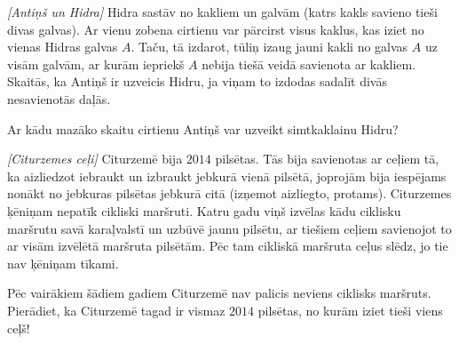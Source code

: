 \begin{problem}
\textit{[Antiņš un Hidra]}
Hidra sastāv no kakliem un galvām (katrs kakls savieno tieši divas galvas). Ar vienu zobena cirtienu var pārcirst visus kaklus, kas iziet no vienas Hidras galvas $A$. Taču, tā izdarot, tūliņ izaug jauni kakli no galvas $A$ uz visām galvām, ar kurām iepriekš $A$ nebija tiešā veidā savienota ar kakliem. 
Skaitās, ka Antiņš ir uzveicis Hidru, ja viņam to izdodas sadalīt divās nesavienotās daļās. 

Ar kādu mazāko skaitu cirtienu Antiņš var uzveikt simtkaklainu Hidru?

\end{problem}
%

\begin{problem}
\textit{[Citurzemes ceļi]}
Citurzemē bija $2014$ pilsētas. Tās bija savienotas ar ceļiem tā, ka aizliedzot iebraukt un izbraukt jebkurā vienā pilsētā, joprojām bija iespējams nonākt no jebkuras pilsētas jebkurā citā (izņemot aizliegto, protams). 
Citurzemes ķēniņam nepatīk cikliski maršruti. Katru gadu viņš izvēlas kādu ciklisku maršrutu savā karaļvalstī un uzbūvē jaunu pilsētu, ar tiešiem ceļiem savienojot to ar visām izvēlētā maršruta 
pilsētām. Pēc tam cikliskā maršruta ceļus slēdz, jo tie nav ķēniņam tīkami.

Pēc vairākiem šādiem gadiem Citurzemē nav palicis neviens ciklisks maršruts. Pierādiet, ka Citurzemē tagad ir vismaz $2014$ pilsētas, no kurām iziet tieši viens ceļš!

\end{problem}
%

%
%
%
% 
%


